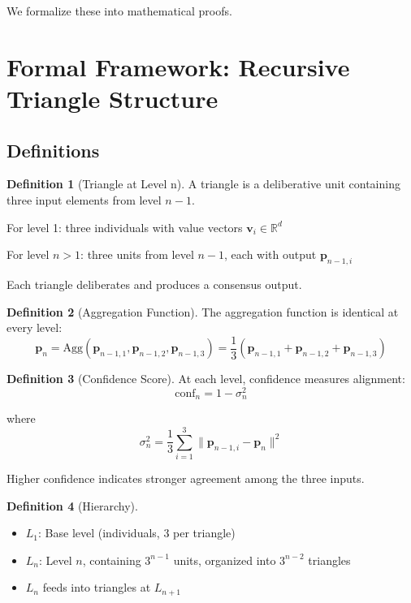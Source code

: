 \documentclass[12pt,a4paper]{article}
\theoremstyle{definition}
\newtheorem{definition}{Definition}[section]
\begin{document}
We formalize these into mathematical proofs.

\section{Formal Framework: Recursive Triangle Structure}

\subsection{Definitions}

\begin{definition}[Triangle at Level n]
A triangle is a deliberative unit containing three input elements from level $n-1$. 

For level 1: three individuals with value vectors $\mathbf{v}_i \in \mathbb{R}^d$

For level $n > 1$: three units from level $n-1$, each with output $\mathbf{p}_{n-1,i}$

Each triangle deliberates and produces a consensus output.
\end{definition}

\begin{definition}[Aggregation Function]
The aggregation function is identical at every level:
$$\mathbf{p}_n = \text{Agg}(\mathbf{p}_{n-1,1}, \mathbf{p}_{n-1,2}, \mathbf{p}_{n-1,3}) = \frac{1}{3}(\mathbf{p}_{n-1,1} + \mathbf{p}_{n-1,2} + \mathbf{p}_{n-1,3})$$
\end{definition}

\begin{definition}[Confidence Score]
At each level, confidence measures alignment:
$$\text{conf}_n = 1 - \sigma^2_n$$

where 
$$\sigma^2_n = \frac{1}{3}\sum_{i=1}^{3} \|\mathbf{p}_{n-1,i} - \mathbf{p}_n\|^2$$

Higher confidence indicates stronger agreement among the three inputs.
\end{definition}

\begin{definition}[Hierarchy]
\begin{itemize}
    \item $L_1$: Base level (individuals, 3 per triangle)
    \item $L_n$: Level $n$, containing $3^{n-1}$ units, organized into $3^{n-2}$ triangles
    \item $L_n$ feeds into triangles at $L_{n+1}$
\end{itemize}
\end{definition}
\end{document}

